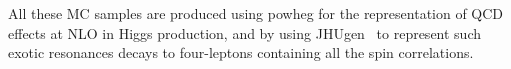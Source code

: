 All these MC samples are produced using {\sc powheg} 
for the representation of QCD effects at NLO in Higgs production, and by using {\sc JHUgen}~\cite{Gao:2010qx,Bolognesi:2012mm,Anderson:2013afp} to 
represent such exotic resonances decays to four-leptons containing all the spin correlations.
\par
